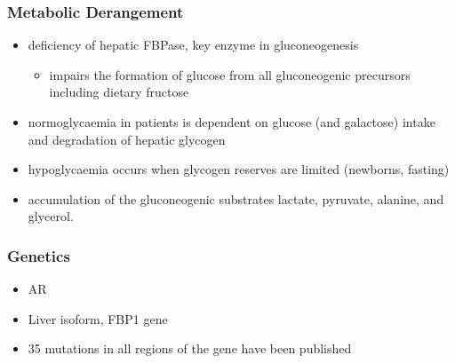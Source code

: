 \documentclass{scrartcl}
\begin{document}
\subsubsection{Metabolic Derangement}
\label{sec:org1a3fb3d}
\begin{itemize}
\item deficiency of hepatic FBPase, key enzyme in gluconeogenesis
\begin{itemize}
\item impairs the formation of glucose from all gluconeogenic precursors including dietary fructose
\end{itemize}
\item normoglycaemia in patients is dependent on glucose (and galactose)
intake and degradation of hepatic glycogen
\item hypoglycaemia occurs when glycogen reserves are limited (newborns, fasting)
\item accumulation of the gluconeogenic substrates lactate, pyruvate, alanine, and glycerol.
\end{itemize}
\subsubsection{Genetics}
\label{sec:org74be715}
\begin{itemize}
\item AR
\item Liver isoform, FBP1 gene
\item 35 mutations in all regions of the gene have been published
\end{itemize}
\end{document}
